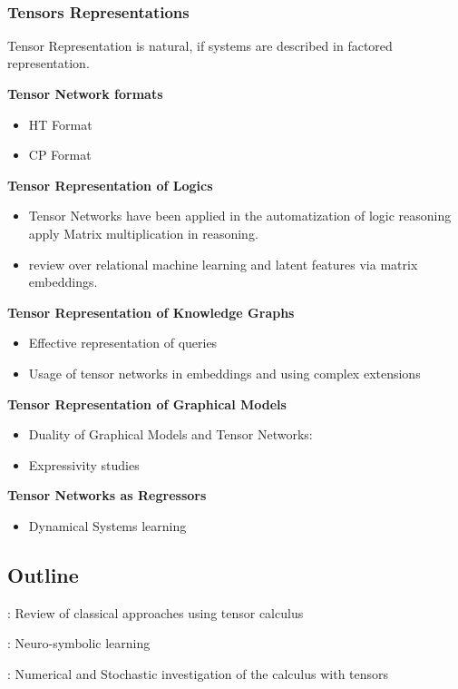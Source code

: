  


\subsubsection{Tensors Representations}

Tensor Representation is natural, if systems are described in factored representation.

\textbf{Tensor Network formats}
\begin{itemize}
	\item HT Format \cite{hackbusch_scheme_2009}
	\item CP Format 
\end{itemize}


\textbf{Tensor Representation of Logics}
\begin{itemize}
	\item Tensor Networks have been applied in the automatization of logic reasoning \cite{li_linear_2017, sato_linear_2017} apply Matrix multiplication in reasoning.
	\item \cite{nickel_review_2016} review over relational machine learning and latent features via matrix embeddings.
\end{itemize}

\textbf{Tensor Representation of Knowledge Graphs}
\begin{itemize}
	\item Effective representation of queries 
	\item Usage of tensor networks in embeddings \cite{yang_embedding_2015} and using complex extensions \cite{trouillon_complex_2017, trouillon_knowledge_2017}
\end{itemize}


\textbf{Tensor Representation of Graphical Models}
\begin{itemize}
	\item Duality of Graphical Models and Tensor Networks:
\cite{robeva_duality_2019}
	\item Expressivity studies \cite{glasser_expressive_2019}
\end{itemize}



\textbf{Tensor Networks as Regressors}
\begin{itemize}
	\item Dynamical Systems learning \cite{gels_multidimensional_2019, goesmann_tensor_2020}
\end{itemize}





\subsection{Outline}



: Review of classical approaches using tensor calculus

: Neuro-symbolic learning

: Numerical and Stochastic investigation of the calculus with tensors

